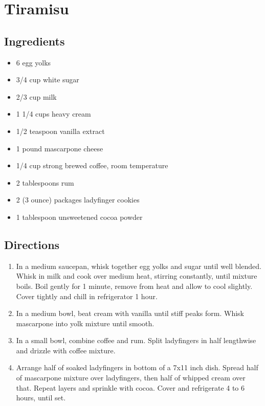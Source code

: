 \documentclass[oneside,11pt]{book}
\newcommand{\Ingredients}[1]{
    \subsection*{Ingredients}
    \begin{itemize} 
        #1 
    \end{itemize}
}
\newcommand{\Directions}[1]{
    \subsection*{Directions}
    \begin{enumerate} 
        #1 
    \end{enumerate}
}
\newcommand{\recipe}[3]{
	\pagebreak
    \section*{ \hspace{-12pt} #1 }
    \addcontentsline{toc}{section}{ \hspace{-6pt} #1 }
	
	\begin{minipage}[t]{0.35\textwidth}
	    #2
	\end{minipage}
	\hspace{0.05\textwidth}
	\begin{minipage}[t]{0.6\textwidth}
	    #3
	\end{minipage}
}
\begin{document}
    \recipe{Tiramisu}{
        \Ingredients{
            \item 6 egg yolks 
            \item 3/4 cup white sugar 
            \item 2/3 cup milk 
            \item 1 1/4 cups heavy cream 
            \item 1/2 teaspoon vanilla extract 
            \item 1 pound mascarpone cheese 
            \item 1/4 cup strong brewed coffee, room temperature
            \item 2 tablespoons rum 
            \item 2 (3 ounce) packages ladyfinger cookies 
            \item 1 tablespoon unsweetened cocoa powder
        }
	}{
        \Directions{
            \item In a medium saucepan, whisk together egg yolks and sugar until well blended. 
                Whisk in milk and cook over medium heat, stirring constantly, until mixture boils. 
                Boil gently for 1 minute, remove from heat and allow to cool slightly. 
                Cover tightly and chill in refrigerator 1 hour.
            \item In a medium bowl, beat cream with vanilla until stiff peaks form. 
                Whisk mascarpone into yolk mixture until smooth.
            \item In a small bowl, combine coffee and rum. 
                Split ladyfingers in half lengthwise and drizzle with coffee mixture.
            \item Arrange half of soaked ladyfingers in bottom of a 7x11 inch dish. 
                Spread half of mascarpone mixture over ladyfingers, then half of whipped cream over that. 
                Repeat layers and sprinkle with cocoa. Cover and refrigerate 4 to 6 hours, until set.
        }
    }
	
\end{document}
